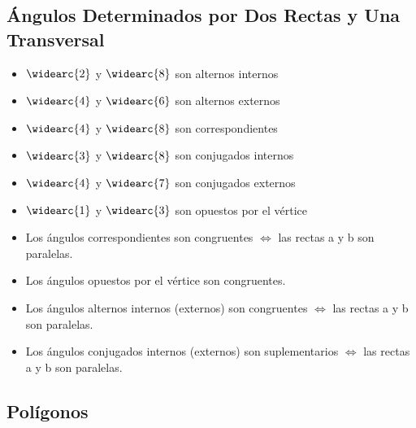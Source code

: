 \documentclass[10pt]{article}
\begin{document}
\subsection{Ángulos Determinados por Dos Rectas y Una Transversal}
\begin{multicols}{2}
\begin{itemize}
\item $\widearc{2}$ y $\widearc{8}$ son alternos internos
\item $\widearc{4}$ y $\widearc{6}$ son alternos externos
\item $\widearc{4}$ y $\widearc{8}$ son correspondientes
\item $\widearc{3}$ y $\widearc{8}$ son conjugados internos
\item $\widearc{4}$ y $\widearc{7}$ son conjugados externos
\item $\widearc{1}$ y $\widearc{3}$ son opuestos por el vértice
\end{itemize}
\end{multicols}
\begin{itemize}
\item Los ángulos correspondientes son congruentes $\iff$ las rectas a y b son paralelas.
\item Los ángulos opuestos por el vértice son congruentes.
\item Los ángulos alternos internos (externos) son congruentes $\iff$ las rectas a y b son paralelas.
\item Los ángulos conjugados internos (externos) son suplementarios $\iff$ las rectas a y b son paralelas.
\end{itemize}
\subsection{Polígonos}
\begin{center}
\end{center}
\end{document}
